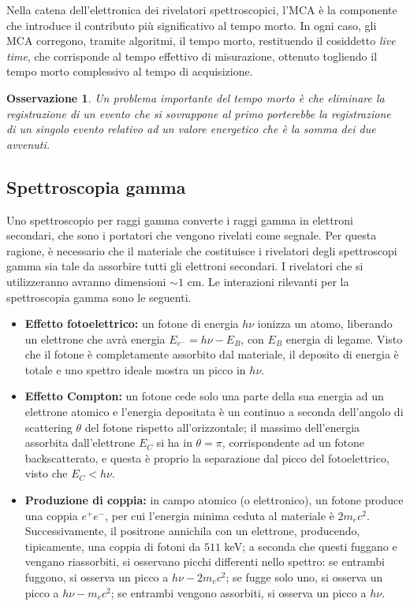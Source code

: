 \documentclass[11pt, a4paper]{scrartcl}
\theoremstyle{style}
\newtheorem{osservazione}{Osservazione}[section]
\numberwithin{equation}{subsection}
\begin{document}
Nella catena dell'elettronica dei rivelatori spettroscopici, l'MCA \`e la componente che introduce il contributo pi\`u significativo al tempo morto.
In ogni caso, gli MCA corregono, tramite algoritmi, il tempo morto, restituendo il cosiddetto \textit{live time}, che corrisponde al tempo effettivo di misurazione, ottenuto togliendo il tempo morto complessivo al tempo di acquisizione.

\begin{osservazione}
Un problema importante del tempo morto \`e che eliminare la registrazione di un evento che si sovrappone al primo porterebbe la registrazione di un singolo evento relativo ad un valore energetico che \`e la somma dei due avvenuti.
\end{osservazione}
\subsection{Spettroscopia gamma}
Uno spettroscopio per raggi gamma converte i raggi gamma in elettroni secondari, che sono i portatori che vengono rivelati come segnale. 
Per questa ragione, \`e necessario che il materiale che costituisce i rivelatori degli spettroscopi gamma sia tale da assorbire tutti gli elettroni secondari.
I rivelatori che si utilizzeranno avranno dimensioni $\sim 1$ cm.
Le interazioni rilevanti per la spettroscopia gamma sono le seguenti.
\begin{itemize}
	\item \textbf{Effetto fotoelettrico:} un fotone di energia $h\nu $ ionizza un atomo, liberando un elettrone che avr\`a energia $E_{e^-} = h\nu  - E_B$, con $E_B$ energia di legame.
		Visto che il fotone \`e completamente assorbito dal materiale, il deposito di energia \`e totale e uno spettro ideale mostra un picco in $h\nu $.
	\item \textbf{Effetto Compton:} un fotone cede solo una parte della sua energia ad un elettrone atomico e l'energia depositata \`e un continuo a seconda dell'angolo di scattering $\theta $ del fotone rispetto all'orizzontale; il massimo dell'energia assorbita dall'elettrone $E_C$ si ha in $\theta =  \pi$, corrispondente ad un fotone backscatterato, e questa \`e proprio la separazione dal picco del fotoelettrico, visto che $E_C < h\nu $.
	\item \textbf{Produzione di coppia:} in campo atomico (o elettronico), un fotone produce una coppia $e^+e^-$, per cui l'energia minima ceduta al materiale \`e $2m_e c^2$.
		Successivamente, il positrone annichila con un elettrone, producendo, tipicamente, una coppia di fotoni da $511$ keV; a seconda che questi fuggano e vengano riassorbiti, si osservano picchi differenti nello spettro: se entrambi fuggono, si osserva un picco a $h\nu  - 2m_ec^2$; se fugge solo uno, si osserva un picco a $h\nu  - m_ec^2	$; se entrambi vengono assorbiti, si osserva un picco a $h\nu$.
\end{itemize}
\end{document}
